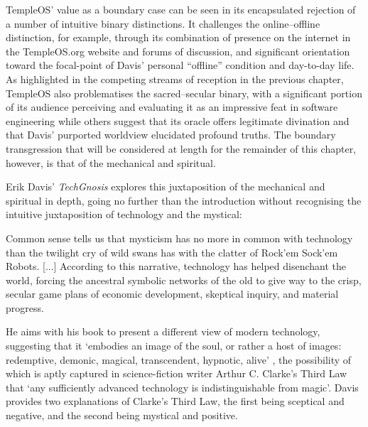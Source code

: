 \documentclass[Draft.tex]{subfiles}
\begin{document}
TempleOS' value as a boundary case can be seen in its encapsulated rejection
of a number of intuitive binary distinctions.
It challenges the online--offline distinction, for example, through
its combination of presence on the internet in the TempleOS.org website
and forums of discussion, and significant orientation toward the
focal-point of Davis' personal ``offline'' condition and day-to-day life.
As highlighted in the competing streams of reception in the previous chapter,
TempleOS also problematises the sacred--secular binary,
with a significant portion of its audience perceiving and evaluating it
as an impressive feat in software engineering while others suggest
that its oracle offers legitimate divination and that Davis'
purported worldview elucidated profound truths.
The boundary transgression that will be considered at length for the remainder
of this chapter, however, is that of the mechanical and spiritual.

Erik Davis' \parencite*[2--3]{Davis98} \textit{TechGnosis} explores this
juxtaposition of the mechanical and spiritual in depth,
going no further than the introduction without recognising the intuitive
juxtaposition of technology and the mystical:
\begin{displayquote}
  Common sense tells us that mysticism has no more in common with technology
  than the twilight cry of wild swans has with
  the clatter of Rock'em Sock'em Robots. [...]
  According to this narrative, technology has helped disenchant the world,
  forcing the ancestral symbolic networks of the old to give way to the crisp,
  secular game plans of economic development, skeptical inquiry,
  and material progress.
\end{displayquote}
He aims with his book to present a different view of modern technology,
suggesting that it `embodies an image of the soul, or rather a host of images:
redemptive, demonic, magical, transcendent, hypnotic, alive'
\parencite[9]{Davis98}, the possibility of which is aptly captured in
science-fiction writer Arthur C. Clarke's \parencite*[21]{Clarke73} Third Law
that `any sufficiently advanced technology is indistinguishable from magic'.
Davis provides two explanations of Clarke's Third Law, the first being
sceptical and negative, and the second being mystical and positive.
\end{document}
